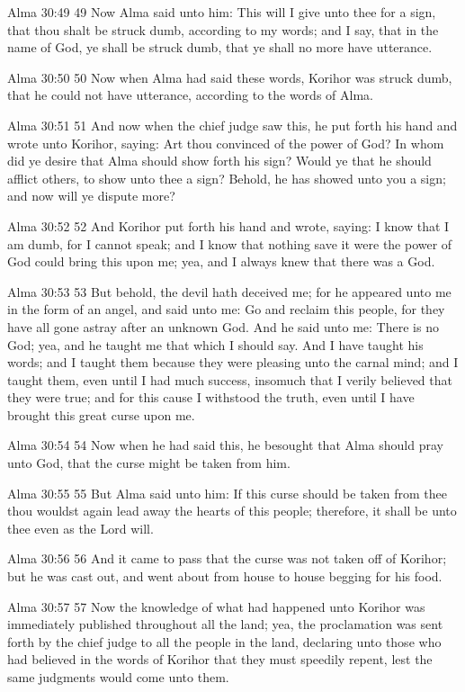 Alma 30:49
 49 Now Alma said unto him: This will I give unto thee for a
sign, that thou shalt be struck dumb, according to my words; and
I say, that in the name of God, ye shall be struck dumb, that ye
shall no more have utterance.

Alma 30:50
 50 Now when Alma had said these words, Korihor was struck dumb,
that he could not have utterance, according to the words of Alma.

Alma 30:51
 51 And now when the chief judge saw this, he put forth his hand
and wrote unto Korihor, saying: Art thou convinced of the power
of God? In whom did ye desire that Alma should show forth his
sign? Would ye that he should afflict others, to show unto thee
a sign? Behold, he has showed unto you a sign; and now will ye
dispute more?

Alma 30:52
 52 And Korihor put forth his hand and wrote, saying: I know that
I am dumb, for I cannot speak; and I know that nothing save it
were the power of God could bring this upon me; yea, and I always
knew that there was a God.

Alma 30:53
 53 But behold, the devil hath deceived me; for he appeared unto
me in the form of an angel, and said unto me: Go and reclaim this
people, for they have all gone astray after an unknown God. And
he said unto me: There is no God; yea, and he taught me that
which I should say. And I have taught his words; and I taught
them because they were pleasing unto the carnal mind; and I
taught them, even until I had much success, insomuch that I
verily believed that they were true; and for this cause I
withstood the truth, even until I have brought this great curse
upon me.

Alma 30:54
 54 Now when he had said this, he besought that Alma should pray
unto God, that the curse might be taken from him.

Alma 30:55
 55 But Alma said unto him: If this curse should be taken from
thee thou wouldst again lead away the hearts of this people;
therefore, it shall be unto thee even as the Lord will.

Alma 30:56
 56 And it came to pass that the curse was not taken off of
Korihor; but he was cast out, and went about from house to house
begging for his food.

Alma 30:57
 57 Now the knowledge of what had happened unto Korihor was
immediately published throughout all the land; yea, the
proclamation was sent forth by the chief judge to all the people
in the land, declaring unto those who had believed in the words
of Korihor that they must speedily repent, lest the same
judgments would come unto them.

